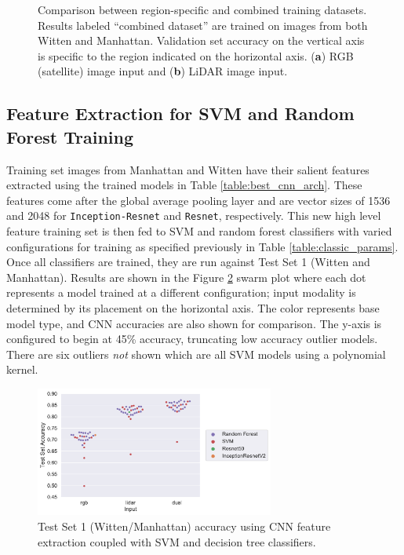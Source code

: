 \begin{figure}[h]
    \caption[Accuracy between region-specific and combined training datasets]{Comparison between region-specific  and combined training datasets. Results labeled ``combined dataset'' are trained on images from both Witten and Manhattan. Validation set accuracy on the vertical axis is specific to the region indicated on the horizontal axis. (\textbf{a}) RGB (satellite) image input and (\textbf{b}) LiDAR image input.}
    \label{fig:cnn_multi}
\end{figure}


\vspace{-12pt}


\subsection{Feature Extraction for SVM and Random Forest Training}

Training set images from Manhattan and Witten have their salient features extracted using the trained models in Table \ref{table:best_cnn_arch}.  These features come after the global average pooling layer and are vector sizes of 1536 and 2048 for \texttt{Inception-Resnet} and \texttt{Resnet}, respectively. This new high level feature training set is then fed to SVM and random forest classifiers with varied configurations for training as specified previously in Table \ref{table:classic_params}. Once all classifiers are trained, they are run against Test Set     1 (Witten and Manhattan). Results are shown in the Figure \ref{fig:test_classical_train} swarm plot where each dot represents a model trained at a different configuration; input modality is determined by its placement on the  horizontal axis. The color represents base model type, and  \ac{CNN}  accuracies are also shown for comparison. The y-axis is configured to begin at 45\% accuracy, truncating low accuracy outlier models. There are six outliers \emph{not} shown which are all SVM models using a polynomial kernel.

\begin{figure}[h]
\centering
\includegraphics[width=0.7\textwidth]{chapter_4_roofshape/imgs/test_data_set_classical.pdf}
\caption[Test Set 1 Accuracy]{Test Set     1 (Witten/Manhattan) accuracy using CNN feature extraction coupled with SVM and decision tree classifiers.}
\label{fig:test_classical_train}
\end{figure}

